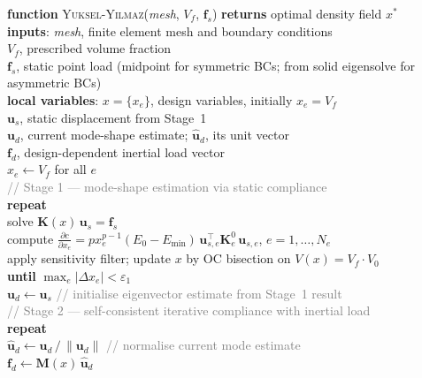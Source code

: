 \documentclass[12pt,a4paper]{article}
\newcommand{\kw}[1]{\textbf{#1}}          %
\newcommand{\fn}[1]{\textsc{#1}}          %
\newcommand{\var}[1]{\textit{#1}}         %
\newcommand{\cm}[1]{\textcolor{gray}{#1}} %
\newcommand{\ind}{\hspace*{1.4em}}        %
\newcommand{\assign}{\ensuremath{\leftarrow}}%
\begin{document}
\medskip
\begin{algobox}
\kw{function} \fn{Yuksel-Yilmaz}(\var{mesh}, $V_f$,
$\mathbf{f}_s$) \kw{returns} optimal density field $x^*$\\[2pt]
\ind\kw{inputs}: \var{mesh}, finite element mesh and boundary conditions\\
\ind\hspace*{4.2em}$V_f$, prescribed volume fraction\\
\ind\hspace*{4.2em}$\mathbf{f}_s$, static point load
  (midpoint for symmetric BCs; from solid eigensolve for asymmetric BCs)\\[2pt]
\ind\kw{local variables}:
  $x=\{x_e\}$, design variables, initially $x_e = V_f$\\
\ind\hspace*{9.5em}
  $\mathbf{u}_s$, static displacement from Stage~1\\
\ind\hspace*{9.5em}
  $\mathbf{u}_d$, current mode-shape estimate;
  $\hat{\mathbf{u}}_d$, its unit vector\\
\ind\hspace*{9.5em}
  $\mathbf{f}_d$, design-dependent inertial load vector\\[6pt]
%
$x_e \assign V_f$ \quad for all $e$\\[4pt]
%
\cm{// Stage 1 — mode-shape estimation via static compliance}\\
\kw{repeat}\\
\ind solve $\mathbf{K}(\var{x})\,\mathbf{u}_s = \mathbf{f}_s$\\
\ind compute
    $\frac{\partial c}{\partial x_e}
    = p x_e^{p-1}(E_0-E_{\min})\,\mathbf{u}_{s,e}^{\top}\mathbf{K}_e^0\,\mathbf{u}_{s,e}$,
    \quad $e=1,\ldots,N_e$\\
\ind apply sensitivity filter; update $x$ by OC bisection on
    $V(\var{x})=V_f\cdot V_0$\\
\kw{until} $\max_e|\Delta x_e| < \varepsilon_1$\\[4pt]
%
$\mathbf{u}_d \assign \mathbf{u}_s$
\quad\cm{// initialise eigenvector estimate from Stage~1 result}\\[4pt]
%
\cm{// Stage 2 — self-consistent iterative compliance with inertial load}\\
\kw{repeat}\\
\ind $\hat{\mathbf{u}}_d \assign \mathbf{u}_d\,/\,\|\mathbf{u}_d\|$
  \quad\cm{// normalise current mode estimate}\\
\ind $\mathbf{f}_d \assign \mathbf{M}(\var{x})\,\hat{\mathbf{u}}_d$

\end{algobox}
\end{document}
